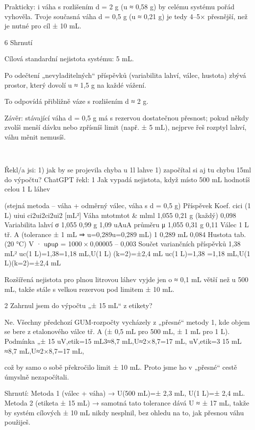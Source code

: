 {    Prakticky: i váha s rozlišením d = 2 g (u ≈ 0,58 g) by celému systému pořád vyhověla.
    Tvoje současná váha d = 0,5 g (u ≈ 0,21 g) je tedy 4–5× přesnější, než je nutné pro cíl ± 10 mL.

6 Shrnutí

    Cílová standardní nejistota systému: 5 mL.

    Po odečtení „nevyladitelných“ příspěvků (variabilita lahví, válec, hustota) zbývá prostor, který dovolí u ≈ 1,5 g na každé vážení.

    To odpovídá přibližně váze s rozlišením d ≈ 2 g.

    Závěr: stávající váha d = 0,5 g má s rezervou dostatečnou přesnost; pokud někdy zvolíš menší dávku nebo zpřísníš limit (např. ± 5 mL), nejprve řeš rozptyl lahví, váhu měnit nemusíš. ​

    ​

Řekl/a jsi:
1) jak by se projevila chyba u 1l lahve
1) započítal si aj tu chybu 15ml do výpočtu?
ChatGPT řekl:
1 Jak vypadá nejistota, když místo 500 mL hodnotíš celou 1 L láhev

(stejná metoda – váha + odměrný válec, váha s d = 0,5 g)
Příspěvek	Koef. cici​ (1 L)	uiui​	ci2ui2ci2​ui2​ [mL²]
Váha mtotmtot​ & mlml​	1,055	0,21 g (každý)	0,098
Variabilita lahví σ	1,055	0,99 g	1,09
uAuA​ průměru μ	1,055	0,31 g	0,11
Válec 1 L tř. A (tolerance ± 1 mL ⇒ u=0,289u=0,289 mL)	1	0,289 mL	0,084
Hustota tab. (20 °C)	V · uρuρ​ = 1000 × 0,00005	–	0,003
Součet variančních příspěvků			1,38 mL²
uc(1 L)=1,38=1,18 mL,U(1 L)  (k=2)=±2,4 mL
uc​(1 L)=1,38
​=1,18 mL,U(1 L)(k=2)=±2,4 mL​

    Rozšířená nejistota pro plnou litrovou láhev vyjde jen o ≈ 0,1 mL větší než u 500 mL, takže stále s velkou rezervou pod limitem ± 10 mL.

2 Zahrnul jsem do výpočtu „± 15 mL“ z etikety?

Ne.
Všechny předchozí GUM-rozpočty vycházely z „přesné“ metody 1,
kde objem se bere z etalonového válce tř. A (± 0,5 mL pro 500 mL, ± 1 mL pro 1 L).
Podmínka „± 15 %
uV,etik=15 mL3≈8,7 mL,U≈2×8,7=17 mL,
uV,etik​=3
​15 mL​≈8,7 mL,U≈2×8,7=17 mL,

což by samo o sobě překročilo limit ± 10 mL.
Proto jsme ho v „přesné“ cestě úmyslně nezapočítali.

    Shrnutí:
    Metoda 1 (válec + váha) → U(500 mL)=± 2,3 mL, U(1 L)=± 2,4 mL.
    Metoda 2 (etiketa ± 15 mL) → samotná tato tolerance dává U ≈ ± 17 mL, takže by systém cílových ± 10 mL nikdy nesplnil, bez ohledu na to, jak přesnou váhu použiješ.

}
